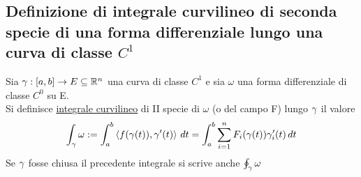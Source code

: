 \subsection{ Definizione di integrale curvilineo di seconda specie di una forma
differenziale lungo una curva di classe $C^1$}
\begin{definition}
  Sia $\gamma:[a,b]\to E\subseteq\mathbb{R}^n$ una curva di classe $C^1$ e sia
  $\omega$ una forma differenziale di classe $C^0$ su E. \\
  Si definisce \underline{integrale curvilineo} di II specie di $\omega$
  (o del campo F) lungo $\gamma$ il valore 
  $$\int_{\gamma} \omega := \int_{a}^{b} \left\langle f(\gamma(t)), \gamma'(t) \right\rangle\,dt = 
    \int_{a}^{b} \sum_{i=1}^{n} F_i(\gamma(t))\gamma_i'(t) \,dt$$
  Se $\gamma$ fosse chiusa il precedente integrale si scrive anche $\oint_{\gamma} \omega$
\end{definition}